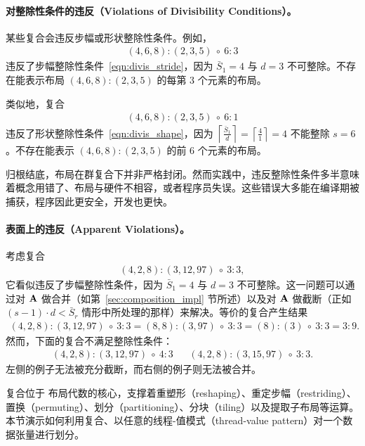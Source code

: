 \paragraph{对整除性条件的违反（Violations of Divisibility Conditions）。}
某些复合会违反步幅或形状整除性条件。例如，
\begin{align*}
(4,6,8):(2,3,5) \ \circ \  6:3
\end{align*}
违反了步幅整除性条件~\eqref{eqn:divis_stride}，因为 $\bar{S}_1 = 4$ 与 $d = 3$ 不可整除。不存在能表示布局 $(4,6,8):(2,3,5)$ 的每第 3 个元素的布局。

类似地，复合
\begin{align*}
(4,6,8):(2,3,5) \ \circ \  6:1
\end{align*}
违反了形状整除性条件~\eqref{eqn:divis_shape}，因为 $\left\lceil \frac{\bar{S}_1}{d} \right\rceil = \left\lceil \frac{4}{1} \right\rceil = 4$ 不能整除 $s = 6$。不存在能表示 $(4,6,8):(2,3,5)$ 的前 6 个元素的布局。

归根结底，\CuTe 布局在群复合下并非严格封闭。然而实践中，违反整除性条件多半意味着概念用错了、布局与硬件不相容，或者程序员失误。这些错误大多能在编译期被捕获，程序因此更安全，开发也更快。

\paragraph{表面上的违反（Apparent Violations）。}

考虑复合
\begin{align*}
(4,2,8):(3,12,97) \ \circ \  3:3,
\end{align*}
它看似违反了步幅整除性条件，因为 $\bar{S}_1 = 4$ 与 $d = 3$ 不可整除。这一问题可以通过对 $\mathbf{A}$ 做合并（如第~\ref{sec:composition_impl} 节所述）以及对 $\mathbf{A}$ 做截断（正如 $(s-1) \cdot d < \bar{S}_r$ 情形中所处理的那样）来解决。等价的复合产生结果
\begin{align*}
(4,2,8):(3,12,97) \ \circ \  3:3 = (8,8):(3,97) \ \circ \  3:3 = (8):(3) \ \circ \  3:3 = 3:9.
\end{align*}
然而，下面的复合不满足整除性条件：
\begin{align*}
(4,2,8):(3,12,97) \ \circ \  4:3 && (4,2,8):(3,15,97) \ \circ \  3:3.
\end{align*}
左侧的例子无法被充分截断，而右侧的例子则无法被合并。


\label{sec:layouttv}

复合位于 \CuTe 布局代数的核心，支撑着重塑形（reshaping）、重定步幅（restriding）、置换（permuting）、划分（partitioning）、分块（tiling）以及提取子布局等运算。本节演示如何利用复合、以任意的线程-值模式（thread-value pattern）对一个数据张量进行划分。

